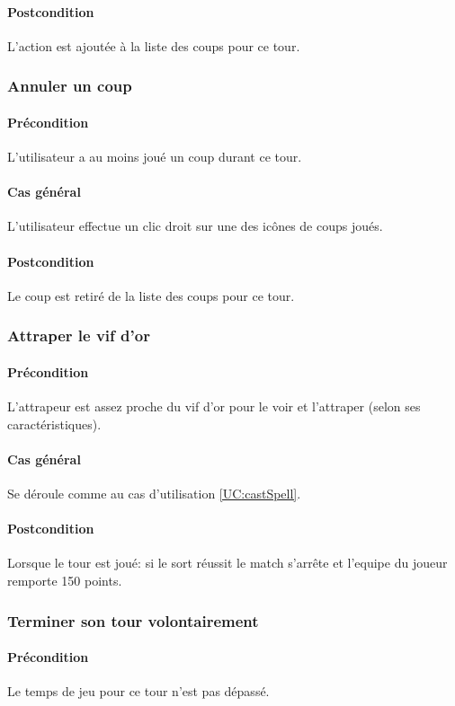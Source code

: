     \paragraph{Postcondition} L'action est ajoutée à la liste des coups pour ce tour.

\subsubsection{Annuler un coup}
    \paragraph{Précondition} L'utilisateur a au moins joué un coup durant ce \gls{tour}.
    \paragraph{Cas général} L'utilisateur effectue un clic droit sur une des icônes de coups joués.
    \paragraph{Postcondition} Le coup est retiré de la liste des coups pour ce tour.

\subsubsection{Attraper le vif d'or}
    \paragraph{Précondition} L'attrapeur est assez proche du vif d'or pour le voir et l'attraper (selon ses caractéristiques).
    \paragraph{Cas général} Se déroule comme au cas d'utilisation \ref{UC:castSpell}.
    \paragraph{Postcondition} Lorsque le tour est joué: si le sort réussit le match s'arrête et l'\gls{equipe} du joueur remporte 150 points.

\subsubsection{Terminer son tour volontairement}
    \paragraph{Précondition} Le temps de jeu pour ce tour n'est pas dépassé.

